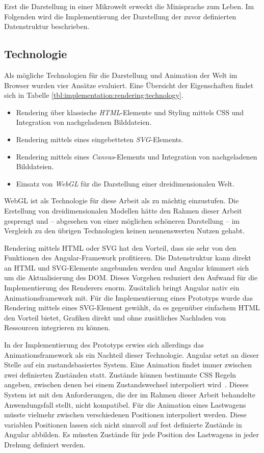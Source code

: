 Erst die Darstellung in einer Mikrowelt erweckt die Minisprache zum Leben. Im Folgenden wird die Implementierung der Darstellung der zuvor definierten Datenstruktur beschrieben.

\subsection{Technologie}
\label{sec:implementation:rendering:technology}

Als mögliche Technologien für die Darstellung und Animation der Welt im Browser wurden vier Ansätze evaluiert. Eine Übersicht der Eigenschaften findet sich in Tabelle \ref{tbl:implementation:rendering:technology}.

\begin{itemize}[noitemsep]
  \item Rendering über klassische \emph{HTML}-Elemente und Styling mittels CSS und Integration von nachgeladenen Bilddateien.
  \item Rendering mittels eines eingebetteten \emph{SVG}-Elements.
  \item Rendering mittels eines \emph{Canvas}-Elements und Integration von nachgeladenen Bilddateien.
  \item Einsatz von \emph{WebGL} für die Darstellung einer dreidimensionalen Welt.
\end{itemize}

WebGL ist als Technologie für diese Arbeit als zu mächtig einzustufen. Die Erstellung von dreidimensionalen Modellen hätte den Rahmen dieser Arbeit gesprengt und -- abgesehen von einer möglichen schöneren Darstellung -- im Vergleich zu den übrigen Technologien keinen nennenswerten Nutzen gehabt.

Rendering mittels HTML oder SVG hat den Vorteil, dass sie sehr von den Funktionen des Angular-Framework profitieren. Die Datenstruktur kann direkt an HTML und SVG-Elemente angebunden werden und Angular kümmert sich um die Aktualisierung des DOM. Dieses Vorgehen reduziert den Aufwand für die Implementierung des Renderers enorm. Zusätzlich bringt Angular nativ ein Animationsframework mit. Für die Implementierung eines Prototyps wurde das Rendering mittels eines SVG-Element gewählt, da es gegenüber einfachem HTML den Vorteil bietet, Grafiken direkt und ohne zusätliches Nachladen von Ressourcen integrieren zu können.

In der Implementierung des Prototyps erwies sich allerdings das Animationsframework als ein Nachteil dieser Technologie. Angular setzt an dieser Stelle auf ein zustandsbasiertes System. Eine Animation findet immer zwischen zwei definierten Zuständen statt. Zustände können bestimmte CSS Regeln angeben, zwischen denen bei einem Zustandswechsel interpoliert wird~\cite{angular-animations}. Dieses System ist mit den Anforderungen, die der im Rahmen dieser Arbeit behandelte Anwendungsfall stellt, nicht kompatibel. Für die Animation eines Lastwagens müsste vielmehr zwischen verschiedenen Positionen interpoliert werden. Diese variablen Positionen lassen sich nicht sinnvoll auf fest definierte Zustände in Angular abbilden. Es müssten Zustände für jede Position des Lastwagens in jeder Drehung definiert werden.

